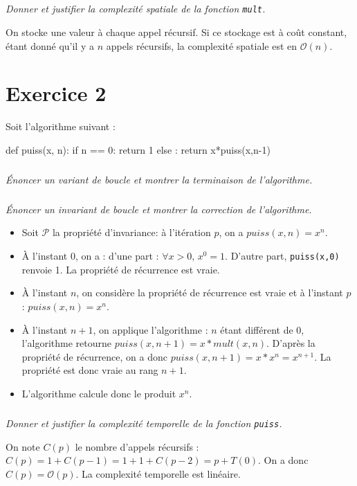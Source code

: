 \documentclass[10pt,fleqn]{book} %
\begin{document}
\begin{multicols}{2}
\subparagraph{}
\textit{Donner et justifier la complexité spatiale de la fonction \texttt{mult}.}
\ifprof
\begin{corrige}
On stocke une valeur à chaque appel récursif. Si ce stockage est à coût constant, étant donné qu'il y a $n$ appels récursifs, la complexité spatiale est en $\mathcal{O}(n)$.
\end{corrige}
\else
\fi

\section*{Exercice 2}
\setcounter{exo}{0}

Soit l'algorithme suivant : 

\begin{py}
\begin{python}
def puiss(x, n):
    if n == 0:
        return 1
    else :
        return x*puiss(x,n-1)
\end{python}
\end{py}

\subparagraph{}
\textit{Énoncer un variant de boucle et montrer la terminaison de l'algorithme.}

\subparagraph{}
\textit{Énoncer un invariant de boucle et montrer la correction de l'algorithme.}
\ifprof
\begin{corrige}
\begin{itemize}
\item Soit $\mathcal{P}$ la propriété d'invariance: à l'itération $p$, on a $puiss(x,n)=x^n$. 
\item À l'instant 0, on a : d'une part : $\forall x>0$, $x^0 = 1$. D'autre part, \texttt{puiss(x,0)} renvoie 1. La propriété de récurrence est vraie. 
\item À l'instant $n$, on considère la propriété de récurrence est vraie et à l'instant $p$ : $puiss(x,n)=x^n$.
\item À l'instant $n+1$, on applique l'algorithme : $n$ étant différent de 0, l'algorithme retourne $puiss(x,n+1)=x*mult(x,n)$. D'après la propriété de récurrence, on a donc $puiss(x,n+1)=x*x^n=x^{n+1} $. La propriété est donc vraie au rang $n+1$.
\item L'algorithme calcule donc le produit $x^n$.
\end{itemize}   
\end{corrige}
\else
\fi
\subparagraph{}
\textit{Donner et justifier la complexité temporelle de la fonction \texttt{puiss}.}
\ifprof
\begin{corrige}
On note $C(p)$ le nombre d'appels récursifs : $C(p) = 1+C(p-1) = 1+1+C(p-2)=p+T(0)$. On a donc $C(p)=\mathcal{O}(p)$. La complexité temporelle est linéaire.
\end{corrige}
\else
\fi


\end{multicols}
\end{document}
